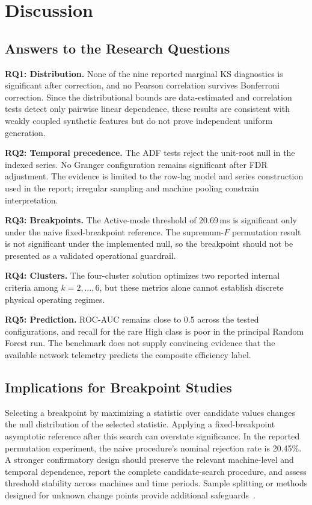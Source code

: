 \documentclass[conference]{IEEEtran}
\begin{document}
\section{Discussion}
\label{sec:discussion}

\subsection{Answers to the Research Questions}
\noindent\textbf{RQ1: Distribution.} None of the nine reported marginal KS diagnostics is significant after correction, and no Pearson correlation survives Bonferroni correction. Since the distributional bounds are data-estimated and correlation tests detect only pairwise linear dependence, these results are consistent with weakly coupled synthetic features but do not prove independent uniform generation.

\noindent\textbf{RQ2: Temporal precedence.} The ADF tests reject the unit-root null in the indexed series. No Granger configuration remains significant after FDR adjustment. The evidence is limited to the row-lag model and series construction used in the report; irregular sampling and machine pooling constrain interpretation.

\noindent\textbf{RQ3: Breakpoints.} The Active-mode threshold of 20.69\,ms is significant only under the naive fixed-breakpoint reference. The supremum-$F$ permutation result is not significant under the implemented null, so the breakpoint should not be presented as a validated operational guardrail.

\noindent\textbf{RQ4: Clusters.} The four-cluster solution optimizes two reported internal criteria among $k = 2, \dots, 6$, but these metrics alone cannot establish discrete physical operating regimes.

\noindent\textbf{RQ5: Prediction.} ROC-AUC remains close to 0.5 across the tested configurations, and recall for the rare High class is poor in the principal Random Forest run. The benchmark does not supply convincing evidence that the available network telemetry predicts the composite efficiency label.

\subsection{Implications for Breakpoint Studies}
Selecting a breakpoint by maximizing a statistic over candidate values changes the null distribution of the selected statistic. Applying a fixed-breakpoint asymptotic reference after this search can overstate significance. In the reported permutation experiment, the naive procedure's nominal rejection rate is 20.45\%. A stronger confirmatory design should preserve the relevant machine-level and temporal dependence, report the complete candidate-search procedure, and assess threshold stability across machines and time periods. Sample splitting or methods designed for unknown change points provide additional safeguards~\cite{andrews1993tests, hansen2000sample}.
\end{document}
